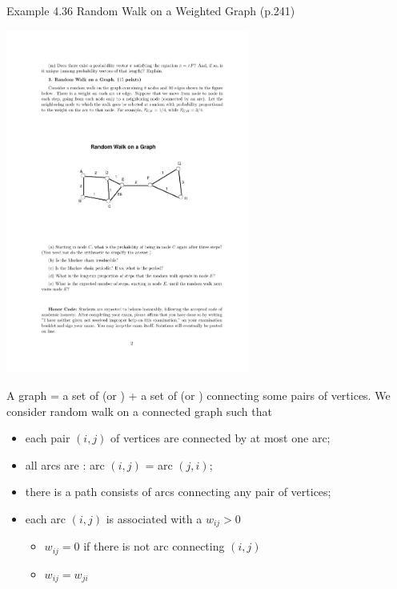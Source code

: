 \documentclass[letterpaper, mathserif]{beamer}
\begin{document}
\begin{frame}{Example 4.36 Random Walk on a Weighted Graph (p.241)}
\begin{center}
\includegraphics[width=0.6\textwidth]{WeightedGraph}
\end{center}
A graph = a set of  (or ) + a set of   (or ) connecting some pairs of vertices. We consider random walk on a connected graph such that
\begin{itemize}
\item each pair $(i,j)$ of vertices are connected by at most one arc;
\item all arcs are : arc $(i,j)$ = arc $(j,i)$;
\item there is a path consists of arcs connecting any pair of vertices;
\item each arc $(i,j)$ is associated with a  $w_{ij}>0$
\begin{itemize}
\item $w_{ij}=0$ if there is not arc connecting $(i,j)$
\item $w_{ij}=w_{ji}$
\end{itemize}
\end{itemize}
\end{frame}
\end{document}
